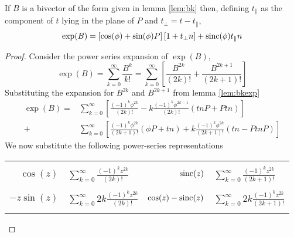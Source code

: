 \begin{thm}
\label{lem:exp}
If $B$ is a bivector of the form given in lemma \ref{lem:bk}
then, defining 
$t_\parallel$ as the component of $t$ lying in the plane of $P$ 
and $t_\perp = t - t_\parallel$,
\[
\exp(B) = \left[ \cos(\phi) + \sin(\phi) P \right] \left[ 1 + t_\perp n \right] + \mathrm{sinc}(\phi) t_\parallel n
\]
\end{thm}
\begin{proof}
Consider the power series expansion of $\exp (B)$,
\[
\exp (B)=\sum _{k=0}^{\infty }\frac{B^{k}}{k!}=\sum _{k=0}^{\infty }\left[\frac{B^{2k}}{(2k)!}+\frac{B^{2k+1}}{(2k+1)!}\right]\]
Substituting the expansion for $B^{2k}$ and $B^{2k+1}$ from 
lemma \ref{lem:bkexp}
\begin{align*}
\exp (B)= & \sum _{k=0}^{\infty }\left[
 \frac{
   (-1)^k\phi^{2k}
 }{(2k)!} - k \frac{
   (-1)^k\phi^{2k-1}
 }{(2k)!} \left(tnP + Ptn\right)
\right]\\
+ & \sum _{k=0}^{\infty }\left[
 \frac{
   (-1)^k\phi^{2k}
 }{(2k+1)!} \left(\phi P + tn\right) + 
 k\frac{
   (-1)^k \phi^{2k}
 }{(2k+1)!} \left( tn - PtnP \right)\right]
\end{align*}
We now substitute the following power-series representations

\begin{centering}


\begin{tabular}{r@{$\ =\ $}l@{$\quad$}r@{$\ = \ $}l}
\multicolumn{4}{l}{\vspace{0.1cm}} \\
$\cos(z)$ & $\sum_{k=0}^\infty \frac{(-1)^k z^{2k}}{(2k)!}$ &
$\mathrm{sinc}(z)$ & $\sum_{k=0}^\infty \frac{(-1)^k z^{2k}}{(2k+1)!}$ \\
\multicolumn{4}{l}{\vspace{0.1cm}} \\
$- z \sin(z)$ & $\sum_{k=0}^\infty 2k \frac{(-1)^k z^{2k}}{(2k)!}$ &
$\cos(z) - \mathrm{sinc}(z)$ & $\sum_{k=0}^\infty 2k \frac{(-1)^k z^{2k}}{(2k+1)!}$ \\
\multicolumn{4}{l}{\vspace{0.1cm}} \\
\end{tabular}


\end{centering}
\end{proof}

